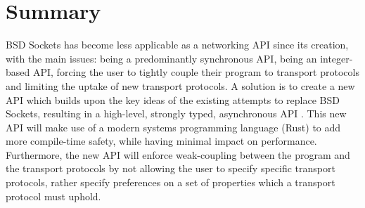 \section{Summary}\label{sec:summary}
BSD Sockets has become less applicable as a networking API since its creation, with the main issues: being a
predominantly synchronous API, being an integer-based API, forcing the user to tightly couple their program to
transport protocols and limiting the uptake of new transport protocols.
A solution is to create a new API which builds upon the key ideas of the existing attempts to replace BSD Sockets,
resulting in a high-level, strongly typed, asynchronous API .
This new API will make use of a modern systems programming language (Rust) to add more compile-time safety, while having
minimal impact on performance.
Furthermore, the new API will enforce weak-coupling between the program and the transport protocols by not allowing the
user to specify specific transport protocols, rather specify preferences on a set of properties which a transport
protocol must uphold.


